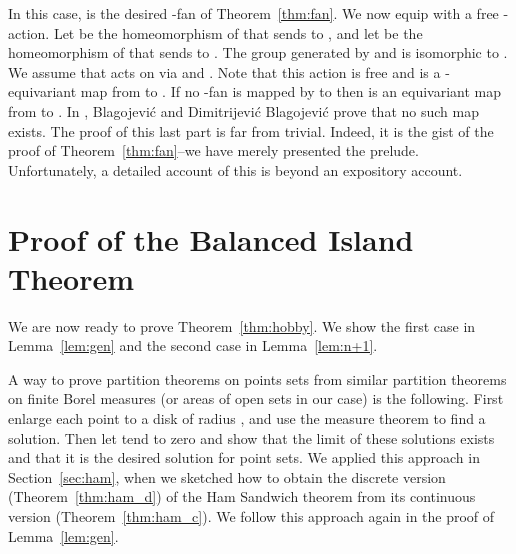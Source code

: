 \documentclass{article}
\begin{document}
In this case,  is the desired -fan of Theorem~\ref{thm:fan}. 
We now equip  with a free -action. Let  be the homeomorphism
of  that sends  to , and
let  be the homeomorphism of  that sends  to 
. The group generated by  and  is isomorphic to 
. We assume that  acts on  via  and
. Note that this action is free and  is a -equivariant
map from  to . If no -fan is mapped by  to  then  
is an equivariant map from  to . In \cite{equivariant},
Blagojevi\'c and Dimitrijevi\'c Blagojevi\'c prove that no such
map exists. The proof of this last part is far from trivial. Indeed, it is
the gist of the proof of Theorem~\ref{thm:fan}--we have merely presented the prelude.
Unfortunately, a detailed account of this is
 beyond an expository account. 



\section{Proof of the Balanced Island Theorem}\label{sec:hobby}
We are now ready to prove Theorem~\ref{thm:hobby}. We show the first
case in Lemma~\ref{lem:gen} and the second case in Lemma~\ref{lem:n+1}.

A way to prove partition theorems on points sets
from similar partition theorems on finite Borel measures (or areas of open sets in our case)
is the following.
First enlarge each point to a disk of radius , and use the measure
theorem to find a solution. Then let  tend to zero and show
that the limit of these solutions exists and that it is  the desired
solution for point sets. We applied this approach 
in Section~\ref{sec:ham}, when we sketched how to obtain the
 discrete version (Theorem~\ref{thm:ham_d}) of the Ham Sandwich theorem
from its continuous version (Theorem~\ref{thm:ham_c}). We follow
this approach again in the proof of Lemma~\ref{lem:gen}.
\end{document}
